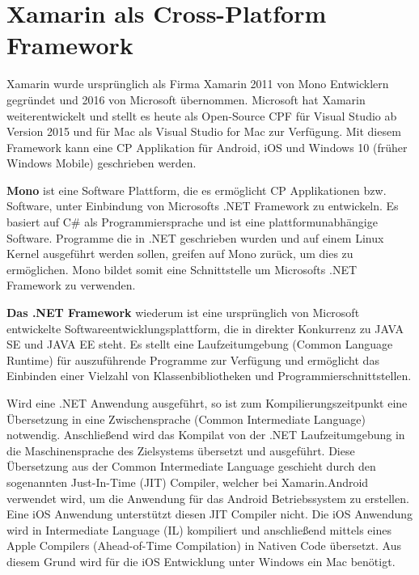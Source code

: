 %
%
% 
% 


\chapter{Xamarin als Cross-Platform Framework}
\label{chap:xamarin}
	Xamarin wurde ursprünglich als Firma Xamarin 2011 von Mono Entwicklern gegründet und 2016 von Microsoft übernommen. Microsoft hat Xamarin weiterentwickelt und stellt es heute als Open-Source CPF für Visual Studio ab Version 2015 und für Mac als Visual Studio for Mac zur Verfügung. Mit diesem Framework kann eine CP Applikation für Android, iOS und Windows 10 (früher Windows Mobile) geschrieben werden.

	\textbf{Mono} ist eine Software Plattform, die es ermöglicht CP Applikationen bzw. Software, unter Einbindung von Microsofts .NET Framework zu entwickeln. Es basiert auf C\# als Programmiersprache und ist eine plattformunabhängige Software. Programme die in .NET geschrieben wurden und auf einem Linux Kernel ausgeführt werden sollen, greifen auf Mono zurück, um dies zu ermöglichen. Mono bildet somit eine Schnittstelle um Microsofts .NET Framework zu verwenden.

	\textbf{Das .NET Framework} wiederum ist eine ursprünglich von Microsoft entwickelte Softwareentwicklungsplattform, die in direkter Konkurrenz zu JAVA SE und JAVA EE steht. Es stellt eine Laufzeitumgebung (Common Language Runtime) für auszuführende Programme zur Verfügung und ermöglicht das Einbinden einer Vielzahl von Klassenbibliotheken und Programmierschnittstellen.

	Wird eine .NET Anwendung ausgeführt, so ist zum Kompilierungszeitpunkt eine Übersetzung in eine Zwischensprache (Common Intermediate Language) notwendig. Anschließend wird das Kompilat von der .NET Laufzeitumgebung in die Maschinensprache des Zielsystems übersetzt und ausgeführt. Diese Übersetzung aus der Common Intermediate Language geschieht durch den sogenannten Just-In-Time (JIT) Compiler, welcher bei Xamarin.Android verwendet wird, um die Anwendung für das Android Betriebssystem zu erstellen. Eine iOS Anwendung unterstützt diesen JIT Compiler nicht. Die iOS Anwendung wird in Intermediate Language (IL) kompiliert und anschließend mittels eines Apple Compilers (Ahead-of-Time Compilation) in Nativen Code übersetzt. Aus diesem Grund wird für die iOS Entwicklung unter Windows ein Mac benötigt.


